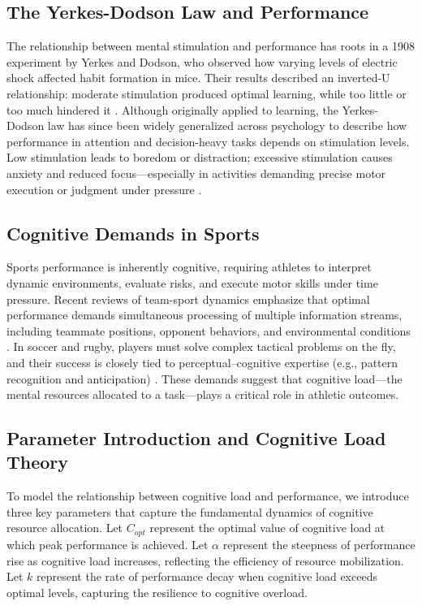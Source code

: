 \documentclass{article}
\begin{document}
\subsection*{The Yerkes-Dodson Law and Performance}

The relationship between mental stimulation and performance has roots in a 1908 experiment by Yerkes and Dodson, who
observed how varying levels of electric shock affected habit formation in mice. Their results described an inverted-U
relationship: moderate stimulation produced optimal learning, while too little or too much hindered it
\citep{yerkes1908}. Although originally applied to learning, the Yerkes-Dodson law has since been widely generalized
across psychology to describe how performance in attention and decision-heavy tasks depends on stimulation levels. Low
stimulation leads to boredom or distraction; excessive stimulation causes anxiety and reduced focus—especially in
activities demanding precise motor execution or judgment under pressure \citep{diamond2005}.

\subsection*{Cognitive Demands in Sports}

Sports performance is inherently cognitive, requiring athletes to interpret dynamic environments, evaluate risks, and
execute motor skills under time pressure. Recent reviews of team-sport dynamics emphasize that optimal performance
demands simultaneous processing of multiple information streams, including teammate positions, opponent behaviors, and
environmental conditions \citep{fuster2021}. In soccer and rugby, players must solve complex tactical problems on the
fly, and their success is closely tied to perceptual–cognitive expertise (e.g., pattern recognition and anticipation)
\citep{macmahon2009}. These demands suggest that cognitive load—the mental resources allocated to a task—plays a
critical role in athletic outcomes.

\subsection*{Parameter Introduction and Cognitive Load Theory}

To model the relationship between cognitive load and performance, we introduce three key parameters that capture the
fundamental dynamics of cognitive resource allocation. Let $C_{opt}$ represent the optimal value of cognitive load at
which peak performance is achieved. Let $\alpha$ represent the steepness of performance rise as cognitive load
increases, reflecting the efficiency of resource mobilization. Let $k$ represent the rate of performance decay when
cognitive load exceeds optimal levels, capturing the resilience to cognitive overload.
\end{document}
